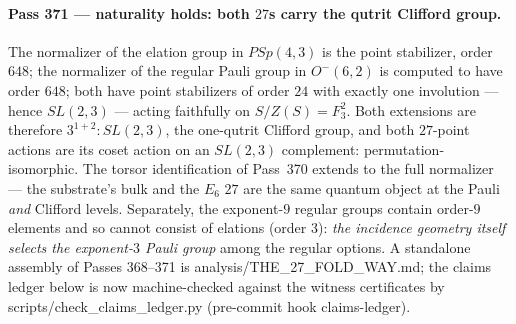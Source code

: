 \documentclass[12pt,a4paper]{article}
\def\mathbb#1{#1}%
\def\mathrm#1{#1}%
\def\textbf#1{#1}%
\def\texttt#1{#1}%
\theoremstyle{definition}
\newcommand{\PSp}{\mathrm{PSp}}
\newcommand{\FF}{\mathbb{F}}
\begin{document}
\paragraph{Pass 371 --- naturality holds: both $27$s carry the qutrit Clifford
group.}
The normalizer of the elation group in $\PSp(4,3)$ is the point stabilizer,
order $648$; the normalizer of the regular Pauli group in $O^-(6,2)$ is
computed to have order $648$; both have point stabilizers of order $24$ with
exactly one involution --- hence $\mathrm{SL}(2,3)$ --- acting faithfully on
$S/Z(S)=\FF_3^2$.  Both extensions are therefore $3^{1+2}{:}\mathrm{SL}(2,3)$,
\textbf{the one-qutrit Clifford group}, and both $27$-point actions are its
coset action on an $\mathrm{SL}(2,3)$ complement: permutation-isomorphic.  The
torsor identification of Pass~370 extends to the full normalizer --- the
substrate's bulk and the $E_6$ $27$ are the same quantum object at the Pauli
\emph{and} Clifford levels.  Separately, the exponent-$9$ regular groups
contain order-$9$ elements and so cannot consist of elations (order $3$):
\emph{the incidence geometry itself selects the exponent-$3$ Pauli group}
among the regular options.  A standalone assembly of Passes 368--371 is
\texttt{analysis/THE\_27\_FOLD\_WAY.md}; the claims ledger below is now
machine-checked against the witness certificates by
\texttt{scripts/check\_claims\_ledger.py} (pre-commit hook \texttt{claims-ledger}).
\end{document}
